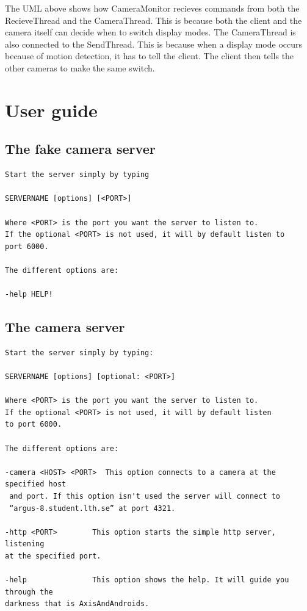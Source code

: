 \documentclass[8pt,titlepage]{article}
\begin{document}
The UML above shows how CameraMonitor recieves commands from both the RecieveThread and the CameraThread. This is because both the client and the camera itself can decide when to switch display modes. The CameraThread is also connected to the SendThread. This is because when a display mode occurs because of motion detection, it has to tell the client. The client then tells the other cameras to make the same switch.

\section{User guide}

\subsection{The fake camera server}
\begin{verbatim}
Start the server simply by typing 

SERVERNAME [options] [<PORT>]

Where <PORT> is the port you want the server to listen to. 
If the optional <PORT> is not used, it will by default listen to 
port 6000.

The different options are:

-help HELP!

\end{verbatim}

\subsection{The camera server}
\begin{verbatim}
Start the server simply by typing:

SERVERNAME [options] [optional: <PORT>]

Where <PORT> is the port you want the server to listen to. 
If the optional <PORT> is not used, it will by default listen 
to port 6000.

The different options are:

-camera <HOST> <PORT>  This option connects to a camera at the 
specified host
 and port. If this option isn't used the server will connect to 
 “argus-8.student.lth.se” at port 4321.

-http <PORT> 		This option starts the simple http server, listening 
at the specified port.

-help 				This option shows the help. It will guide you through the 
darkness that is AxisAndAndroids.
\end{verbatim}
\end{document}
